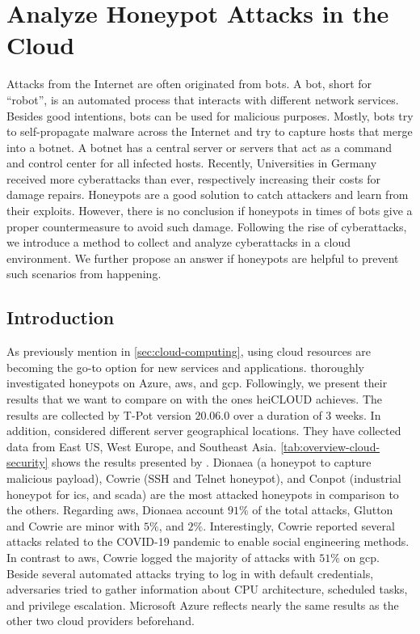 \chapter{Analyze Honeypot Attacks in the Cloud}

Attacks from the Internet are often originated from bots.
A bot, short for \enquote{robot}, is an automated process that interacts with different network services.
Besides good intentions, bots can be used for malicious purposes.
Mostly, bots try to self-propagate malware across the Internet and try to capture hosts that merge into a botnet.
A botnet has a central server or servers that act as a command and control center for all infected hosts.\cite{Feily2009}
Recently, Universities in Germany received more cyberattacks than ever, respectively increasing their costs for damage repairs.
Honeypots are a good solution to catch attackers and learn from their exploits.
However, there is no conclusion if honeypots in times of bots give a proper countermeasure to avoid such damage.
Following the rise of cyberattacks, we introduce a method to collect and analyze cyberattacks in a cloud environment.
We further propose an answer if honeypots are helpful to prevent such scenarios from happening.

\section{Introduction}

As previously mention in \autoref{sec:cloud-computing}, using cloud resources are becoming the go-to option for new services and applications.
\citet{Kelly2021} thoroughly investigated honeypots on Azure, \ac{aws}, and \ac{gcp}.
Followingly, we present their results that we want to compare on with the ones heiCLOUD achieves.
The results are collected by T-Pot version $20.06.0$ over a duration of 3 weeks.
In addition, \citet{Kelly2021} considered different server geographical locations.
They have collected data from East US, West Europe, and Southeast Asia.
\autoref{tab:overview-cloud-security} shows the results presented by \citet{Kelly2021}.
Dionaea (a honeypot to capture malicious payload), Cowrie (SSH and Telnet honeypot), and Conpot (industrial honeypot for \acs{ics}, and \acs{scada}) are the most attacked honeypots in comparison to the others.
Regarding \ac{aws}, Dionaea account $91\%$ of the total attacks, Glutton and Cowrie are minor with $5\%$, and $2\%$.
Interestingly, Cowrie reported several attacks related to the COVID-19 pandemic to enable social engineering methods.
In contrast to \ac{aws}, Cowrie logged the majority of attacks with $51\%$ on \ac{gcp}.
Beside several automated attacks trying to log in with default credentials, adversaries tried to gather information about CPU architecture, scheduled tasks, and privilege escalation.
Microsoft Azure reflects nearly the same results as the other two cloud providers beforehand.

